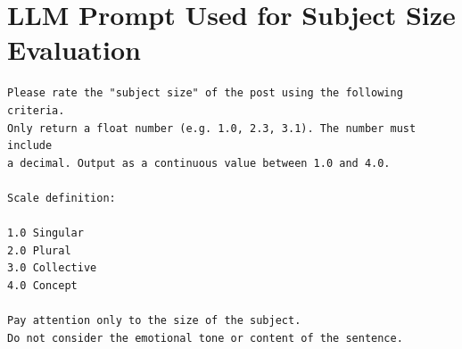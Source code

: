 \documentclass{article}
\begin{document}
\appendix

\section{LLM Prompt Used for Subject Size Evaluation}

\begin{verbatim}
Please rate the "subject size" of the post using the following criteria.
Only return a float number (e.g. 1.0, 2.3, 3.1). The number must include
a decimal. Output as a continuous value between 1.0 and 4.0.

Scale definition:

1.0 Singular
2.0 Plural
3.0 Collective
4.0 Concept

Pay attention only to the size of the subject.
Do not consider the emotional tone or content of the sentence.
\end{verbatim}
\end{document}
